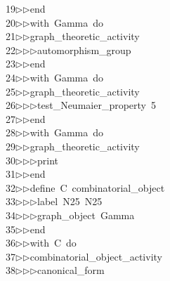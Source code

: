 \begin{tabbing}
19\>$\triangleright$\>$\triangleright$\>end\ \\[0pt]
20\>$\triangleright$\>$\triangleright$\>with\ Gamma\ do\ \\[0pt]
21\>$\triangleright$\>$\triangleright$\>graph\_theoretic\_activity\ \\[0pt]
22\>$\triangleright$\>$\triangleright$\>$\triangleright$\>automorphism\_group\ \\[0pt]
23\>$\triangleright$\>$\triangleright$\>end\ \\[0pt]
24\>$\triangleright$\>$\triangleright$\>with\ Gamma\ do\ \\[0pt]
25\>$\triangleright$\>$\triangleright$\>graph\_theoretic\_activity\ \\[0pt]
26\>$\triangleright$\>$\triangleright$\>$\triangleright$\>test\_Neumaier\_property\ 5\ \\[0pt]
27\>$\triangleright$\>$\triangleright$\>end\ \\[0pt]
28\>$\triangleright$\>$\triangleright$\>with\ Gamma\ do\ \\[0pt]
29\>$\triangleright$\>$\triangleright$\>graph\_theoretic\_activity\ \\[0pt]
30\>$\triangleright$\>$\triangleright$\>$\triangleright$\>print\ \\[0pt]
31\>$\triangleright$\>$\triangleright$\>end\ \\[0pt]
32\>$\triangleright$\>$\triangleright$\>define\ C\ combinatorial\_object\ \\[0pt]
33\>$\triangleright$\>$\triangleright$\>$\triangleright$\>label\ N25\ N25\ \\[0pt]
34\>$\triangleright$\>$\triangleright$\>$\triangleright$\>graph\_object\ Gamma\ \\[0pt]
35\>$\triangleright$\>$\triangleright$\>end\ \\[0pt]
36\>$\triangleright$\>$\triangleright$\>with\ C\ do\ \\[0pt]
37\>$\triangleright$\>$\triangleright$\>combinatorial\_object\_activity\ \\[0pt]
38\>$\triangleright$\>$\triangleright$\>$\triangleright$\>canonical\_form\ \\[0pt]

\end{tabbing}
